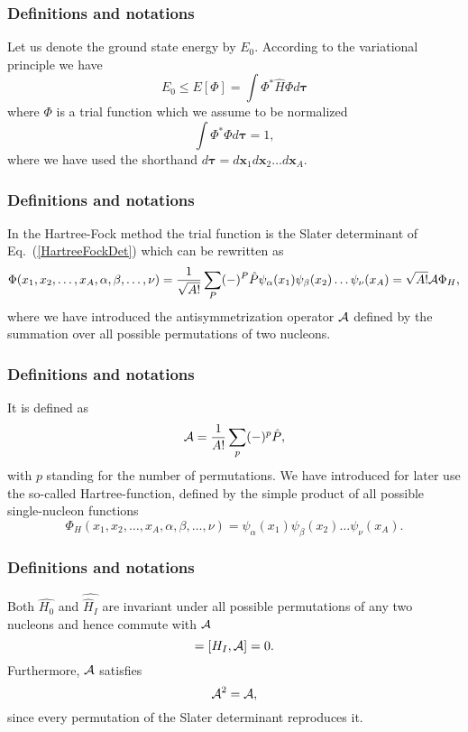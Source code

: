 \documentclass[compress]{beamer}
\begin{document}
\frame
{
  \frametitle{Definitions and notations}
\begin{small}
{\scriptsize
Let us denote the ground state energy by $E_0$. According to the
variational principle we have
\begin{equation*}
  E_0 \le E[\Phi] = \int \Phi^*\hat{H}\Phi d\mathbf{\tau}
\end{equation*}
where $\Phi$ is a trial function which we assume to be normalized
\begin{equation*}
  \int \Phi^*\Phi d\mathbf{\tau} = 1,
\end{equation*}
where we have used the shorthand $d\mathbf{\tau}=d\mathbf{x}_1d\mathbf{x}_2\dots d\mathbf{x}_A$.
}
\end{small}
}

\frame
{
  \frametitle{Definitions and notations}
\begin{small}
{\scriptsize
In the Hartree-Fock method the trial function is the Slater
determinant of Eq.~(\ref{HartreeFockDet}) which can be rewritten as 
\begin{equation}
  \Phi(x_1,x_2,\dots,x_A,\alpha,\beta,\dots,\nu) = \frac{1}{\sqrt{A!}}\sum_{P} (-)^P\hat{P}\psi_{\alpha}(x_1)
    \psi_{\beta}(x_2)\dots\psi_{\nu}(x_A)=\sqrt{A!}{\cal A}\Phi_H,
\label{HartreeFockPermutation}
\end{equation}
where we have introduced the antisymmetrization operator ${\cal A}$ defined by the 
summation over all possible permutations of two nucleons.
}
\end{small}
}

\frame
{
  \frametitle{Definitions and notations}
\begin{small}
{\scriptsize
It is defined as
\begin{equation}
  {\cal A} = \frac{1}{A!}\sum_{p} (-)^p\hat{P},
\label{antiSymmetryOperator}
\end{equation}
with $p$ standing for the number of permutations. We have introduced for later use the so-called
Hartree-function, defined by the simple product of all possible single-nucleon functions
\begin{equation*}
  \Phi_H(x_1,x_2,\dots,x_A,\alpha,\beta,\dots,\nu) =
  \psi_{\alpha}(x_1)
    \psi_{\beta}(x_2)\dots\psi_{\nu}(x_A).
\end{equation*}

}
\end{small}
}

\frame
{
  \frametitle{Definitions and notations}
\begin{small}
{\scriptsize
Both $\hat{H_0}$ and $\hat{\hat{H}_I}$ are invariant under all possible permutations of any two nucleons
and hence commute with ${\cal A}$
\begin{equation}
  [H_0,{\cal A}] = [H_I,{\cal A}] = 0.
  \label{cummutionAntiSym}
\end{equation}
Furthermore, ${\cal A}$ satisfies
\begin{equation}
  {\cal A}^2 = {\cal A},
  \label{AntiSymSquared}
\end{equation}
since every permutation of the Slater
determinant reproduces it. 
}
\end{small}
}
\end{document}
